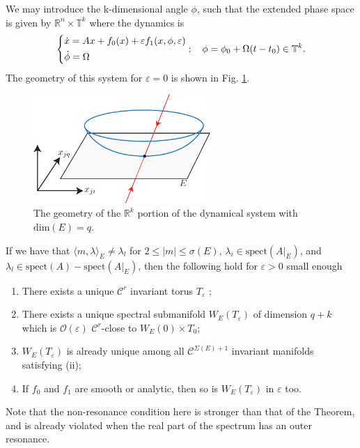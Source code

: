 We may introduce the k-dimensional angle $\phi$, such that the extended phase space is given by $\mathbb{R}^{n} \times \mathbb{T}^{k}$ where the dynamics is 
\begin{align}
\begin{dcases}
	\dot{x} = Ax + f_0(x) + \varepsilon f_1(x, \phi, \varepsilon) \\
	\dot{\phi} = \Omega 
\end{dcases}
;\quad \phi = \phi_0 + \Omega(t-t_0) \in \mathbb{T}^{k}.
\end{align}
The geometry of this system for $\varepsilon=0$ is shown in Fig. \ref{fig:ssm_eps0}.
\begin{figure}[h!]
	\centering
	\includegraphics[width=0.6\textwidth]{figures/ch9/32ssm_ex0.pdf}
	\caption{The geometry of the $\mathbb{R}^{k}$ portion of the dynamical system with $ \textrm{dim} (E) = q$.}
	\label{fig:ssm_eps0}
\end{figure}
\begin{theorem}[]
If we have that $\langle m, \lambda \rangle_E \neq \lambda_l$ for $2 \leq |m| \leq \sigma(E)$, $\lambda_i \in  \textrm{spect} (A|_{E})$, and $\lambda_l \in  \textrm{spect} (A)- \textrm{spect} (A|_{E})$, then the following hold for $\varepsilon >0$ small enough
\begin{enumerate}
	\item There exists a unique $\mathcal{C}^{r}$ invariant torus $T_{\varepsilon}$ ;
	\item There exists a unique spectral submanifold $W_{E}(T_{\varepsilon})$ of dimension $q+k$ which is $\mathcal{O}(\varepsilon)$ $\mathcal{C}^{r}$-close to $W_{E}(0)\times T_0$;
	\item $W_{E}(T_{\varepsilon})$ is already unique among all $\mathcal{C}^{\Sigma(E) + 1}$ invariant manifolds satisfying (ii);
	\item If $f_0$ and $f_1$ are smooth or analytic, then so is $W_{E}(T_\varepsilon)$ in $\varepsilon$ too.
\end{enumerate}
\end{theorem}
\begin{remark}[]
	Note that the non-resonance condition here is stronger than that of the Theorem, and is already violated when the real part of the spectrum has an outer resonance.
\end{remark}

